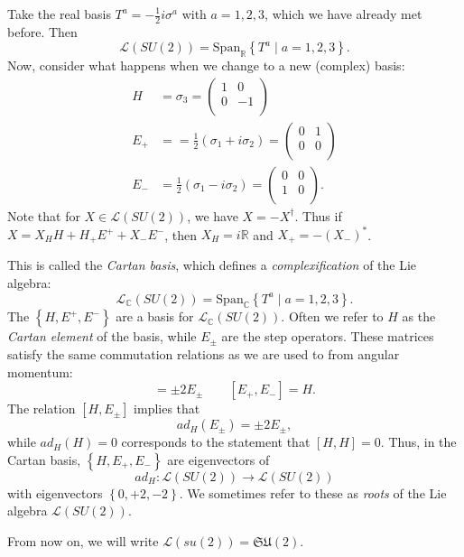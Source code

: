Take the real basis $T^a = - \frac{1}{2} i \sigma^a$ with $a = 1,2,3$, which we have already met before.
Then
\begin{equation}
  \mathscr{L}(SU(2)) = \text{Span}_{\mathbb{R}} \left\{ T^a \mid a = 1,2,3 \right\}.
\end{equation}
Now, consider what happens when we change to a new (complex) basis:
\begin{align}
  H &= \sigma_3 =
  \begin{pmatrix}
   1 & 0 \\
   0 & -1 \\
  \end{pmatrix} \\
  E_+ &= = \frac{1}{2} (\sigma_1 + i \sigma_2) = 
  \begin{pmatrix}
   0 & 1 \\
   0 & 0 \\
  \end{pmatrix} \\
  E_- &= \frac{1}{2} (\sigma_1 - i\sigma_2) =
  \begin{pmatrix}
   0 & 0 \\
   1 & 0 \\
  \end{pmatrix}.
\end{align}
Note that for $X \in \mathscr{L}(SU(2))$, we have $X = -X^{\dagger}$.
Thus if $X = X_H H + H_+ E^+ + X_- E^-$, then $X_H = i \mathbb{R}$ and $X_+ = -(X_-)^*$.

This is called the \emph{Cartan basis}, which defines a \emph{complexification} of the Lie algebra:
\begin{equation}
  \mathscr{L}_{\mathbb{C}} (SU(2)) = \text{Span}_{\mathbb{C}} \left\{ T^a \mid a = 1,2,3 \right\}.
\end{equation}
The $\left\{ H, E^+, E^- \right\}$ are a basis for $\mathscr{L}_{\mathbb{C}}(SU(2))$.
Often we refer to $H$ as the \emph{Cartan element} of the basis, while $E_{\pm}$ are the step operators.
These matrices satisfy the same commutation relations as we are used to from angular momentum:
\begin{equation}
  [H, E_{\pm}] = \pm 2 E_{\pm} \qquad [E_+, E_-] = H.
\end{equation}
The relation $[H, E_{\pm}]$ implies that 
\begin{equation}
  ad_{H}(E_{\pm}) = \pm 2 E_{\pm},
\end{equation}
while $ad_H(H) = 0$ corresponds to the statement that $[H, H] = 0$.
Thus, in the Cartan basis, $\left\{ H, E_+, E_- \right\}$ are eigenvectors of
\begin{equation}
  ad_H \colon \mathscr{L}(SU(2)) \to \mathscr{L}(SU(2))
\end{equation}
with eigenvectors $\left\{ 0, +2, -2 \right\}$. We sometimes refer to these as \emph{roots} of the Lie algebra $\mathscr{L}(SU(2))$.
\begin{leftbar}
  \begin{remark}
    From now on, we will write $\mathscr{L}(su(2)) = \mathfrak{SU}(2)$.
  \end{remark}
\end{leftbar}

